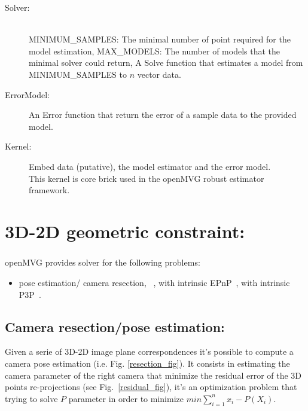 \documentclass[11pt, letterpaper]{report}
\begin{document}
\begin{description}
\item[Solver:]~\\
\subitem MINIMUM\_SAMPLES: The minimal number of point required for the model estimation,
\subitem MAX\_MODELS: The number of models that the minimal solver could return,
\subitem A Solve function that estimates a model from MINIMUM\_SAMPLES to $n$ vector data.
\item[ErrorModel:] An Error function that return the error of a sample data to the provided model.\\
\item[Kernel:] Embed data (putative), the model estimator and the error model.\\
\subitem This kernel is core brick used in the openMVG robust estimator framework.
\end{description}

\newpage
\chapter{3D-2D geometric constraint:}
\paragraph{}
openMVG provides solver for the following problems:
\begin{itemize}
\item pose estimation/ camera resection,
\subitem 6pt~\cite{Hartley2004},
\subitem 4pt with intrinsic EPnP~\cite{DBLP:journals/ijcv/LepetitMF09},
\subitem 3pt with intrinsic P3P~\cite{DBLP:conf/cvpr/KneipSS11}.
\end{itemize}

\newpage
\section{Camera resection/pose estimation:}
Given a serie of 3D-2D image plane correspondences it's possible to compute a camera pose estimation (i.e. Fig. \ref{resection_fig}). It consists in estimating the camera parameter of the right camera that minimize the residual error of the 3D points re-projections (see Fig.~\ref{residual_fig}), it's an optimization problem that trying to solve $P$ parameter in order to minimize $min \sum\limits_{i=1}^n x_i - P(X_i)$.
\end{document}
